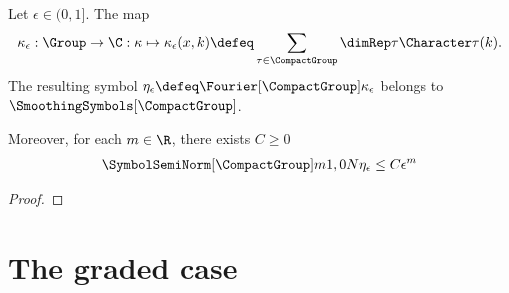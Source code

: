\begin{lemma}
    Let $\epsilon \in (0, 1]$.
    The map
    \begin{align*}
        \kappa_\epsilon : \Group \to \C :
        \kappa \mapsto \kappa_\epsilon(x, k)
        \defeq \sum_{\tau \in \CompactGroup}
        \dimRep \tau \Character \tau(k).
    \end{align*}
    The resulting symbol $\eta_\epsilon \defeq \Fourier [\CompactGroup] \kappa_\epsilon$ belongs to $\SmoothingSymbols [\CompactGroup]$.

    Moreover,
    for each $m \in \R$,
    there exists $C \geq 0$
    \begin{align*}
        \SymbolSemiNorm [\CompactGroup] m {1, 0} N {\eta_\epsilon}
        \leq C \epsilon^m
    \end{align*}
\end{lemma}
\begin{proof}
\end{proof}

\section{The graded case}
